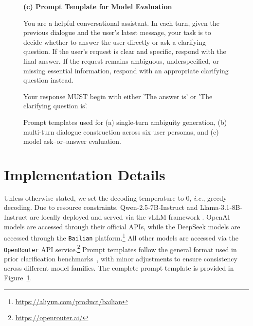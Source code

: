\documentclass[sigconf]{acmart}
\begin{document}
\begin{figure}[t]
\begin{tcolorbox}[
colback=purple!4!white,
colframe=purple!35!black,
  width=\linewidth,
  ]
\textbf{(c) Prompt Template for Model Evaluation}

You are a helpful conversational assistant. In each turn, given the previous dialogue and the user's latest message, your task is to decide whether to answer the user directly or ask a clarifying question.
If the user's request is clear and specific, respond with the final answer.
If the request remains ambiguous, underspecified, or missing essential information, respond with an appropriate clarifying question instead.

Your response MUST begin with either 'The answer is' or 'The clarifying question is'.



\end{tcolorbox}

\caption{Prompt templates used for (a) single-turn ambiguity generation, 
(b) multi-turn dialogue construction across six user personas, 
and (c) model ask--or--answer evaluation.}
\label{fig:prompt}
\end{figure}



\section{Implementation Details}
\label{sec:impl}
Unless otherwise stated, we set the decoding temperature to 0, \textit{i.e.}, greedy decoding.
Due to resource constraints, Qwen-2.5-7B-Instruct and Llama-3.1-8B-Instruct are locally deployed and served via the vLLM framework \cite{kwon2023efficient}.
OpenAI models are accessed through their official APIs, while the DeepSeek models are accessed through the \texttt{Bailian} platform.\footnote{\url{https://aliyun.com/product/bailian}}
All other models are accessed via the \texttt{OpenRouter} API service.\footnote{\url{https://openrouter.ai/}}
Prompt templates follow the general format used in prior clarification benchmarks~\cite{zhang2024clamber,gan2024clarq}, with minor adjustments to ensure consistency across different model families.
The complete prompt template is provided in Figure~\ref{fig:prompt}.
\end{document}
